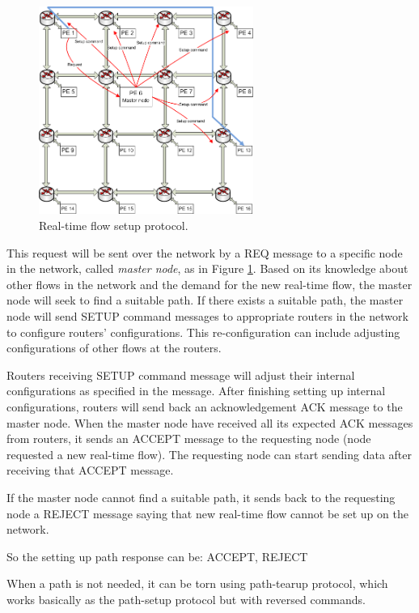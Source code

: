 \documentclass[conference, twocolumn]{IEEEtran}
\theoremstyle{definition}
\begin{document}
\begin{figure}[htp]
\centering
\includegraphics[width=7cm]{pics/Protocol2}
\caption[Setup request for a real-time flow.]
{Real-time flow setup protocol.}\label{fig:ReqSetup}
\end{figure}

This request will be sent over the network by a REQ message to a specific node
in the network, called {\em master node}, as in Figure \ref{fig:ReqSetup}.
Based on its knowledge about other flows in the network and the demand for the
new real-time flow, the master node will seek to find a suitable path. If there
exists a suitable path, the master node will send SETUP command messages to
appropriate routers in the network to configure routers' configurations. This
re-configuration can include adjusting configurations of other flows at the routers.

Routers receiving SETUP command message will adjust their internal
configurations as specified in the message. After finishing setting up internal
configurations, routers will send back an acknowledgement ACK message to
the master node. When the master node have received all its expected ACK
messages from routers, it sends an ACCEPT message to the requesting node
(node requested a new real-time flow). The requesting node can start sending
data after receiving that ACCEPT message.

If the master node cannot find a suitable path, it sends back to the requesting
node a REJECT message saying that new real-time flow cannot be set up on the
network.

So the setting up path response can be: ACCEPT, REJECT

When a path is not needed, it can be torn using path-tearup protocol, which
works basically as the path-setup protocol but with reversed commands.
\end{document}

